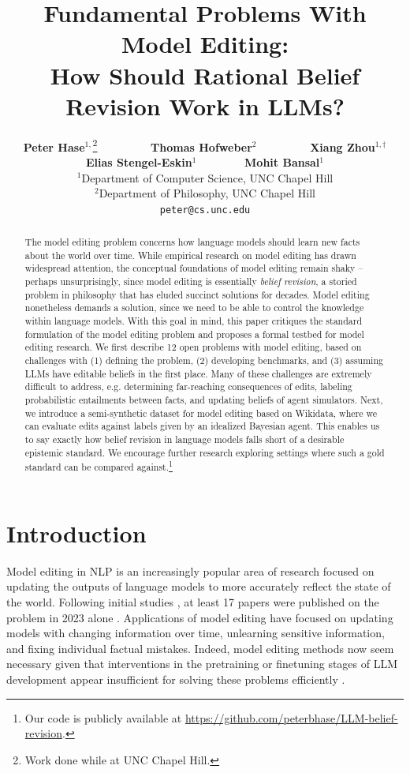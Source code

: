 \documentclass[11pt,a4paper]{article}
\title{Fundamental Problems With Model Editing: \\ How Should Rational Belief Revision Work in LLMs?}
\author{
 \stepcounter{footnote}
 \textbf{Peter Hase}$^{1,}$\thanks{\hspace{2pt} Work done while at UNC Chapel Hill.} \ \ \ \ \ \ \ \ \
 \textbf{Thomas Hofweber}$^{2}$ \ \ \ \ \ \ \ \ \
 \textbf{Xiang Zhou}$^{1,\dag}$ \\ 
 \textbf{Elias Stengel-Eskin}$^{1}$ \ \ \ \ \ \ \ \
 \textbf{Mohit Bansal}$^{1}$ \\
 $^{1}$Department of Computer Science, UNC Chapel Hill \\
 $^{2}$Department of Philosophy, UNC Chapel Hill   \\
 \small\texttt{peter@cs.unc.edu} \\
}
\date{}
\begin{document}
\maketitle

\begin{abstract}
  The model editing problem concerns how language models should learn new facts about the world over time. 
  While empirical research on model editing has drawn widespread attention, the conceptual foundations of model editing remain shaky -- perhaps unsurprisingly, since model editing is essentially \emph{belief revision}, a storied problem in philosophy that has eluded succinct solutions for decades.
  Model editing nonetheless demands a solution, since we need to be able to control the knowledge within language models.
  With this goal in mind, this paper critiques the standard formulation of the model editing problem and proposes a formal testbed for model editing research. 
  We first describe 12 open problems with model editing, based on challenges with (1) defining the problem, (2) developing benchmarks, and (3) assuming LLMs have editable beliefs in the first place. 
  Many of these challenges are extremely difficult to address, e.g. determining far-reaching consequences of edits, labeling probabilistic entailments between facts, and updating beliefs of agent simulators.
  Next, we introduce a semi-synthetic dataset for model editing based on Wikidata, where we can evaluate edits against labels given by an idealized Bayesian agent. 
  This enables us to say exactly how belief revision in language models falls short of a desirable epistemic standard. We encourage further research exploring settings where such a gold standard can be compared against.\footnote{Our code is publicly available at \url{https://github.com/peterbhase/LLM-belief-revision}.}
\end{abstract}

\section{Introduction}
\label{sec:introduction}

Model editing in NLP is an increasingly popular area of research focused on updating the outputs of language models to more accurately reflect the state of the world. Following initial studies \citep{de2021editing, dai2021knowledge, mitchell2021fast, hase2021language}, at least 17 papers were published on the problem in 2023 alone \citep{betz2023probabilistic, pinter-elhadad-2023-emptying, hernandez2023inspecting, hoelscher2023detecting, patil2023can, yao2023editing, zhong2023mquake, han2023divide, hartvigsen2023aging, wu2023depn, wang2023easyedit, wang2023knowledge, wei2023assessing, gupta2023editing, brown2023edit, onoe2023can, li2023unveiling}. Applications of model editing have focused on updating models with changing information over time, unlearning sensitive information, and fixing individual factual mistakes. Indeed, model editing methods now seem necessary given that interventions in the pretraining or finetuning stages of LLM development appear insufficient for solving these problems efficiently \citep{lazaridou2021mind, dhingra2022time, debenedetti2023privacy, casper2023open}. 
\end{document}
